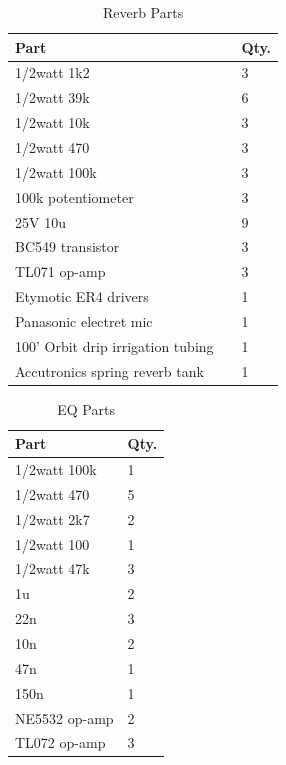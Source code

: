 \documentclass[journal]{IEEEtran}
\begin{document}
	\begin{table}[]
		\centering
		\caption{Reverb Parts}
		\label{tab:reverbParts}
		\begin{tabular}{ll|l}
			Part                             &  & Qty. \\ \hline
			
			1/2watt 1k2                               &  & 3          \\
			1/2watt 39k                               &  & 6          \\
			1/2watt 10k                               &  & 3          \\
			1/2watt 470                               &  & 3          \\
			1/2watt 100k                              &  & 3          \\
			100k potentiometer                &  & 3          \\
			25V 10u                               &  & 9          \\
			BC549 transistor                  &  & 3          \\
			TL071 op-amp                      &  & 3          \\
			Etymotic ER4 drivers              &  & 1          \\
			Panasonic electret mic            &  & 1          \\
			100' Orbit drip irrigation tubing &  & 1          \\
			Accutronics spring reverb tank    &  & 1         
		\end{tabular}
	\end{table}


	\begin{table}[]
		\centering
		\caption{EQ Parts}
		\label{tab:eq}
		\begin{tabular}{l|l}
			Part                               & Qty. \\ \hline
			1/2watt 100k  & 1 \\ 
			1/2watt 470   & 5 \\
			1/2watt 2k7   & 2 \\
			1/2watt 100   & 1 \\
			1/2watt 47k   & 3 \\
			1u            & 2 \\
			22n           & 3 \\
			10n           & 2 \\
			47n           & 1 \\
			150n          & 1 \\
			NE5532 op-amp & 2 \\
			TL072 op-amp  & 3
		\end{tabular}
	\end{table}
\end{document}
